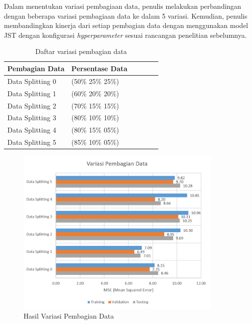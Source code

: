 Dalam menentukan variasi pembagiaan data, penulis melakukan perbandingan dengan beberapa variasi pembagiaan data ke dalam 5 variasi. Kemudian, penulis membandingkan kinerja dari setiap pembagian data dengan menggunakan model JST dengan konfigurasi \textit{hyperparameter} sesuai rancangan penelitian sebelumnya\cite{skripsiTanto}.
\begin{table}[h!]
	\caption{Daftar variasi pembagian data}
	\label{tbl:5:DataSplitting}
	\centering
	\begin{tabular}{|p{3cm}|p{3cm}|p{1.5cm}|p{1cm}|p{1.5cm}|p{1cm}|}
		\hline
		Pembagian Data   & Persentase Data \\ \hline
		Data Splitting 0 & (50\% 25\% 25\%)\\ \hline
		Data Splitting 1 & (60\% 20\% 20\%)\\ \hline
		Data Splitting 2 & (70\% 15\% 15\%)\\ \hline
		Data Splitting 3 & (80\% 10\% 10\%)\\ \hline
		Data Splitting 4 & (80\% 15\% 05\%)\\ \hline
		Data Splitting 5 & (85\% 10\% 05\%)\\ \hline
	\end{tabular}
\end{table}

\begin{figure}[!h]
	\centering
	\includegraphics[width=0.9\textwidth]{figures/DataSplittingResult}
	\caption{Hasil Variasi Pembagian Data}
	\label{fig:5:DataSplittingResult}
\end{figure}

